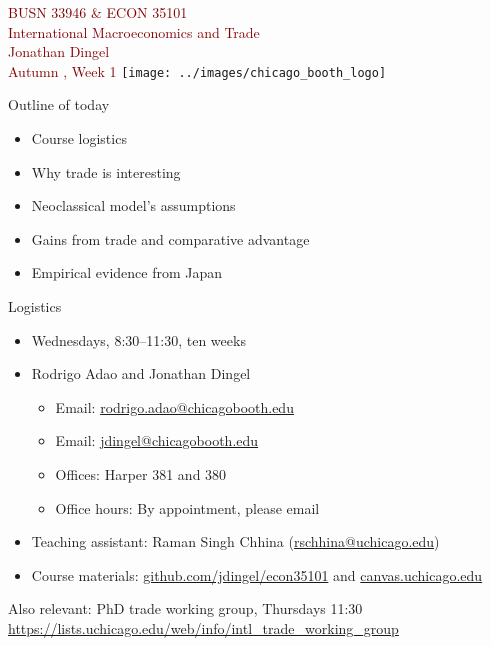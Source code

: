 \documentclass[10pt,notes=hide]{beamer}
\begin{document}
\begin{frame}[plain]
\begin{center}
\large
\textcolor{maroon}{BUSN 33946 \& ECON 35101\\
International Macroeconomics and Trade\\ 
Jonathan Dingel\\
Autumn \the\year, Week 1}
\vfill 
\texttt{[image: ../images/chicago\_booth\_logo]}
\end{center}
\end{frame}
\begin{frame}{Outline of today}
\begin{itemize}
	\item Course logistics
	\item Why trade is interesting
	\item Neoclassical model's assumptions
	\item Gains from trade and comparative advantage
	\item Empirical evidence from Japan
\end{itemize}
\end{frame}
\begin{frame}{Logistics}
\begin{itemize}
\item Wednesdays, 8:30--11:30, ten weeks
\item Rodrigo Adao and Jonathan Dingel
\begin{itemize}
	\item Email: \href{mailto:rodrigo.adao@chicagobooth.edu}{rodrigo.adao@chicagobooth.edu} 
	\item Email: \href{mailto:jdingel@chicagobooth.edu}{jdingel@chicagobooth.edu}
	\item Offices: Harper 381 and 380 
	\item Office hours: By appointment, please email
\end{itemize}
\item Teaching assistant: Raman Singh Chhina (\href{mailto:rschhina@uchicago.edu}{rschhina@uchicago.edu}) 
\item Course materials: \href{http://github.com/jdingel/econ35101}{github.com/jdingel/econ35101} and \href{https://canvas.uchicago.edu/courses/43957}{canvas.uchicago.edu}
\end{itemize}
\vspace{5mm}
Also relevant: PhD trade working group, Thursdays 11:30 \\
{\footnotesize \url{https://lists.uchicago.edu/web/info/intl_trade_working_group}}
\end{frame}
\end{document}
